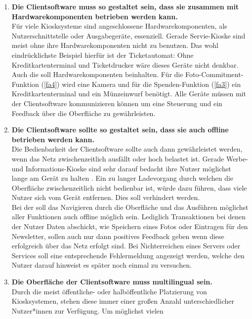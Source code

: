 \begin{enumerate}[label=\textbf{NFA\arabic*}]
	\item\label{nfa1} \textbf{Die Clientsoftware muss so gestaltet sein, dass sie zusammen mit Hardwarekomponenten 
  betrieben werden kann.}\\
  Für viele Kiosksysteme sind angeschlossene Hardwarekomponenten, als Nutzerschnittstelle oder Ausgabegeräte, essenziell.
  Gerade Servie-Kioske sind meist ohne ihre Hardwarekomponenten nicht zu benutzen. Das wohl eindrücklichste
  Beispiel hierfür ist der Ticketautomat: Ohne Kreditkartenterminal und Ticketdrucker wäre dieses Geräte nicht denkbar.\\
  Auch die \shst{} soll Hardwarekomponenten beinhalten. Für die Foto-Commitment-Funktion (\ref{fa4}) wird eine
  Kamera und für die Spenden-Funktion (\ref{fa3}) ein Kreditkartenterminal und ein Münzeinwurf benötigt. Alle 
  Geräte müssen mit der Clientsoftware kommunizieren können um eine Steuerung und ein Feedback über die Oberfläche
  zu gewährleisten. 
	\item\label{nfa2} \textbf{Die Clientsoftware sollte so gestaltet sein, dass sie auch offline 
  betrieben werden kann.}\\
  Die Bedienbarkeit der Clientsoftware sollte auch dann gewährleistet werden, wenn das Netz zwischenzeitlich
  ausfällt oder hoch belastet ist. Gerade Werbe- und Informations-Kioske sind sehr darauf bedacht ihre
  Nutzer möglichst lange am Gerät zu halten \cite{across}. Ein zu langer Ladevorgang durch welchen die 
  Oberfläche zwischenzeitlich nicht bedienbar ist, würde dazu führen, dass viele Nutzer sich 
  vom Gerät entfernen. Dies soll verhindert werden.\\
  Bei der \shst{} soll das Navigieren durch die Oberfläche und das Ausführen möglichst aller Funktionen 
  auch offline möglich sein. Lediglich Transaktionen bei denen der Nutzer Daten abschickt, wie Speichern 
  eines Fotos oder Eintragen für den Newsletter, sollen auch nur dann positives Feedback geben wenn 
  diese erfolgreich über das Netz erfolgt sind. Bei Nichterreichen eines Servers oder Services soll eine entsprechende
  Fehlermeldung angezeigt werden, welche den Nutzer darauf hinweist es später noch einmal zu versuchen.
  \item\label{nfa3} \textbf{Die Oberfläche der Clientsoftware muss multilingual sein.}\\
  Durch die meist öffentliche- oder halböffentliche Platzierung von Kiosksystemen, stehen diese
  immer einer großen Anzahl unterschiedlicher Nutzer*innen zur Verfügung. Um möglichst vielen

\end{enumerate}
